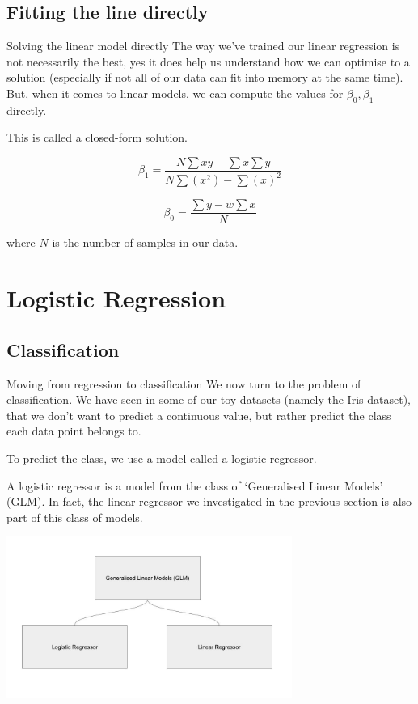 \documentclass[10pt]{beamer}
\begin{document}
\subsection*{Fitting the line directly}
\label{sec:orgf05a94d}
\begin{frame}[label={sec:org8401faf}]{Solving the linear model directly}
The way we've trained our linear regression is not necessarily the
best, yes it does help us understand how we can optimise to a solution
(especially if not all of our data can fit into memory at the same
time). But, when it comes to linear models, we can compute the values
for \(\beta_0, \beta_1\) directly.

This is called a \alert{closed-form solution}.

\[
\beta_1 = \frac{N \sum xy - \sum x \sum y}{N \sum (x^2) - \sum (x)^2}
\]

\[
\beta_0 = \frac{\sum y - w \sum x}{N}
\]

where \(N\) is the number of samples in our data.
\end{frame}

\section*{Logistic Regression}
\label{sec:org8c27a8e}

\subsection*{Classification}
\label{sec:org28cb5ba}

\begin{frame}[label={sec:orgd23ddb6}]{Moving from regression to classification}
We now turn to the problem of classification. We have seen in some of
our toy datasets (namely the Iris dataset), that we don't want to
predict a continuous value, but rather predict the class each data
point belongs to.

To predict the class, we use a model called a logistic regressor.

A logistic regressor is a model from the class of `Generalised Linear
Models' (GLM). In fact, the linear regressor we investigated in the
previous section is also part of this class of models.

\begin{center}
\includegraphics[width=0.7\textwidth]{images/glm.jpg}
\end{center}
\end{frame}
\end{document}
